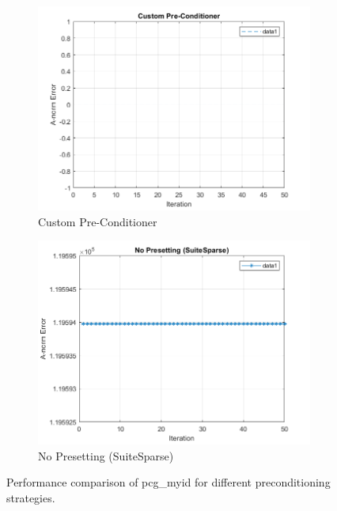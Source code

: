 \begin{figure}[h]
    \begin{subfigure}{0.48\textwidth}
        \includegraphics[width=\textwidth]{Chapters/custom pre con.png}
        \caption{Custom Pre-Conditioner}
        \label{subfig:custom_preconditioner}
    \end{subfigure}
    \hfill
    \begin{subfigure}{0.48\textwidth}
        \includegraphics[width=\textwidth]{Chapters/no presetiing suite.png}
        \caption{No Presetting (SuiteSparse)}
        \label{subfig:no_presetting_suitesparse}
    \end{subfigure}
    
    \caption{Performance comparison of pcg\_myid for different preconditioning strategies.}
    \label{fig:results}
\end{figure}
